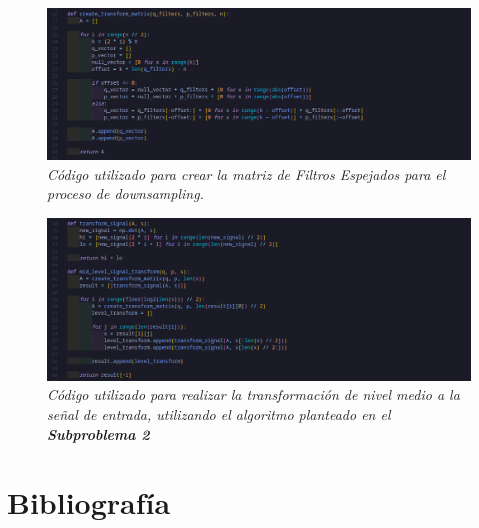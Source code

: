 \documentclass[11pt]{article}
\begin{document}
\begin{figure}
    \includegraphics[width=\textwidth]{filter_bank}
    \caption{\it Código utilizado para crear la matriz de Filtros Espejados para el proceso de downsampling.}
\end{figure}

\begin{figure}
    \includegraphics[width=\textwidth]{transform}
    \caption{\it  Código utilizado para realizar la transformación de nivel medio a la señal de entrada, utilizando el algoritmo planteado en el {\bf Subproblema 2}}
\end{figure}

\clearpage

\section*{Bibliografía}



\end{document}
